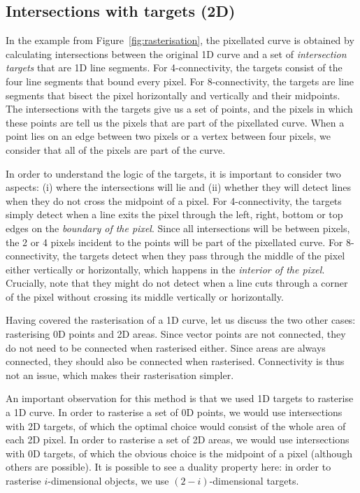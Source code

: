 \subsection{Intersections with targets (2D)}

In the example from Figure~\ref{fig:rasterisation}, the pixellated curve is obtained by calculating intersections between the original 1D curve and a set of \emph{intersection targets} that are 1D line segments.
For 4-connectivity, the targets consist of the four line segments that bound every pixel.
For 8-connectivity, the targets are line segments that bisect the pixel horizontally and vertically and their midpoints.
The intersections with the targets give us a set of points, and the pixels in which these points are tell us the pixels that are part of the pixellated curve.
When a point lies on an edge between two pixels or a vertex between four pixels, we consider that all of the pixels are part of the curve.

In order to understand the logic of the targets, it is important to consider two aspects: (i) where the intersections will lie and (ii) whether they will detect lines when they do not cross the midpoint of a pixel.
For 4-connectivity, the targets simply detect when a line exits the pixel through the left, right, bottom or top edges on the \emph{boundary of the pixel}.
Since all intersections will be between pixels, the 2 or 4 pixels incident to the points will be part of the pixellated curve.
For 8-connectivity, the targets detect when they pass through the middle of the pixel either vertically or horizontally, which happens in the \emph{interior of the pixel}.
Crucially, note that they might do not detect when a line cuts through a corner of the pixel without crossing its middle vertically or horizontally.

Having covered the rasterisation of a 1D curve, let us discuss the two other cases: rasterising 0D points and 2D areas.
Since vector points are not connected, they do not need to be connected when rasterised either.
Since areas are always connected, they should also be connected when rasterised.
Connectivity is thus not an issue, which makes their rasterisation simpler.

An important observation for this method is that we used 1D targets to rasterise a 1D curve.
In order to rasterise a set of 0D points, we would use intersections with 2D targets, of which the optimal choice would consist of the whole area of each 2D pixel.
In order to rasterise a set of 2D areas, we would use intersections with 0D targets, of which the obvious choice is the midpoint of a pixel (although others are possible).
It is possible to see a duality property here: in order to rasterise \(i\)-dimensional objects, we use \((2-i)\)-dimensional targets.

